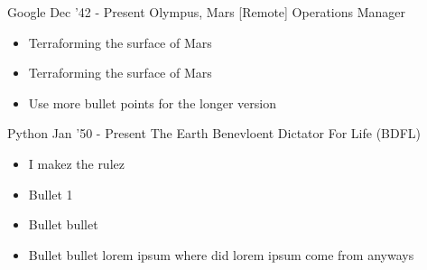 
\cvevent
	{Google}
	{Dec '42 - Present}
	{Olympus, Mars [Remote]}
	{Operations Manager}
	{
        \vspace{-6pt}
        \begin{itemize}
            \item Terraforming the surface of Mars
        \end{itemize}
	}
    {
        \vspace{-6pt}
        \begin{itemize}
            \item Terraforming the surface of Mars
            \item Use more bullet points for the longer version
        \end{itemize}
    }

\vfill\null
\cvevent
	{Python}
	{Jan '50 - Present}
	{The Earth}
	{Benevloent Dictator For Life (BDFL)}
	{
	    \vspace{-6pt}
        \begin{itemize}
            \item I makez the rulez
        \end{itemize}
	}
	{
        \vspace{-6pt}
        \begin{itemize}
            \item Bullet 1
            \item  Bullet bullet
            \item Bullet bullet lorem ipsum where did lorem ipsum come from anyways
        \end{itemize}
    }
